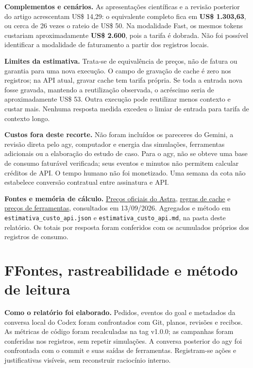 \documentclass[11pt,a4paper]{article}
\newcommand{\titulo}[2]{\section*{\color{navy}#1\quad #2}}
\begin{document}
\textbf{Complementos e cenários.} As apresentações científicas e a revisão posterior do artigo acrescentam US\$ 14,29: o equivalente completo fica em \textbf{US\$ 1.303,63}, ou cerca de 26 vezes o rateio de US\$ 50. Na modalidade Fast, os mesmos tokens custariam aproximadamente \textbf{US\$ 2.600}, pois a tarifa é dobrada. Não foi possível identificar a modalidade de faturamento a partir dos registros locais.

\textbf{Limites da estimativa.} Trata-se de equivalência de preços, não de fatura ou garantia para uma nova execução. O campo de gravação de cache é zero nos registros; na API atual, gravar cache tem tarifa própria. Se toda a entrada nova fosse gravada, mantendo a reutilização observada, o acréscimo seria de aproximadamente US\$ 53. Outra execução pode reutilizar menos contexto e custar mais. Nenhuma resposta medida excedeu o limiar de entrada para tarifa de contexto longo.

\textbf{Custos fora deste recorte.} Não foram incluídos os pareceres do Gemini, a revisão direta pelo agy, computador e energia das simulações, ferramentas adicionais ou a elaboração do estudo de caso. Para o agy, não se obteve uma base de consumo faturável verificada; seus eventos e minutos não permitem calcular créditos de API. O tempo humano não foi monetizado. Uma semana da cota não estabelece conversão contratual entre assinatura e API.

{\small\textbf{Fontes e memória de cálculo.} \href{https://developers.openai.com/api/docs/models/gpt-6-astra}{Preços oficiais do Astra}, \href{https://developers.openai.com/api/docs/guides/prompt-caching}{regras de cache} e \href{https://developers.openai.com/api/docs/pricing}{preços de ferramentas}, consultados em 13/09/2026. Agregados e método em \nolinkurl{estimativa_custo_api.json} e \nolinkurl{estimativa_custo_api.md}, na pasta deste relatório. Os totais por resposta foram conferidos com os acumulados próprios dos registros de consumo.}
\newpage

\titulo{F}{Fontes, rastreabilidade e método de leitura}
\textbf{Como o relatório foi elaborado.} Pedidos, eventos do goal e metadados da conversa local do Codex foram confrontados com Git, planos, revisões e recibos. As métricas de código foram recalculadas na tag v1.0.0; as campanhas foram conferidas nos registros, sem repetir simulações. A conversa posterior do agy foi confrontada com o commit e suas saídas de ferramentas. Registram-se ações e justificativas visíveis, sem reconstruir raciocínio interno.
\end{document}
